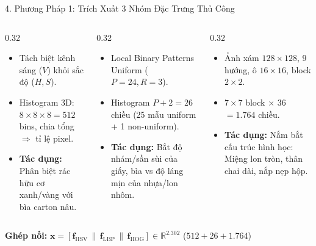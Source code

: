 \documentclass[aspectratio=169, 10pt]{beamer}
\begin{document}
\begin{frame}{4. Phương Pháp 1: Trích Xuất 3 Nhóm Đặc Trưng Thủ Công}
\begin{columns}[T]
  \begin{column}{0.32\textwidth}
    \begin{tcolorbox}[colback=white, colframe=UITBlue, title=\textbf{1. Màu sắc (HSV)}]
      \begin{itemize}
        \item Tách biệt kênh sáng ($V$) khỏi sắc độ ($H, S$).
        \item Histogram 3D: $8 \times 8 \times 8 = 512$ bins, chia tổng $\Rightarrow$ tỉ lệ pixel.
        \item \textbf{Tác dụng:} Phân biệt rác hữu cơ xanh/vàng với bìa carton nâu.
      \end{itemize}
    \end{tcolorbox}
  \end{column}

  \begin{column}{0.32\textwidth}
    \begin{tcolorbox}[colback=white, colframe=UITBlue, title=\textbf{2. Kết cấu (LBP)}]
      \begin{itemize}
        \item Local Binary Patterns Uniform ($P=24, R=3$).
        \item Histogram $P+2 = 26$ chiều (25 mẫu uniform + 1 non-uniform).
        \item \textbf{Tác dụng:} Bắt độ nhám/sần sùi của giấy, bìa vs độ láng mịn của nhựa/lon nhôm.
      \end{itemize}
    \end{tcolorbox}
  \end{column}

  \begin{column}{0.32\textwidth}
    \begin{tcolorbox}[colback=white, colframe=UITBlue, title=\textbf{3. Biên dạng (HOG)}]
      \begin{itemize}
        \item Ảnh xám $128 \times 128$, 9 hướng, ô $16 \times 16$, block $2 \times 2$.
        \item $7 \times 7$ block $\times$ 36 $= 1.764$ chiều.
        \item \textbf{Tác dụng:} Nắm bắt cấu trúc hình học: Miệng lon tròn, thân chai dài, nắp nẹp hộp.
      \end{itemize}
    \end{tcolorbox}
  \end{column}
\end{columns}

\vspace{0.1cm}
\centering
\small\textbf{Ghép nối:} $\mathbf{x} = [\mathbf{f}_{\text{HSV}} \,\|\, \mathbf{f}_{\text{LBP}} \,\|\, \mathbf{f}_{\text{HOG}}] \in \mathbb{R}^{2.302}$ \quad ($512 + 26 + 1.764$)
\end{frame}
\end{document}
